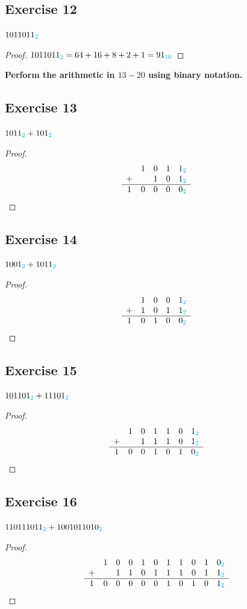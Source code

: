 \documentclass[14pt]{extarticle}
\newcommand{\base}[1]{{\color{cyan}#1}} \newcommand{\da}{\downarrow}
\begin{document}
\subsection{Exercise 12} $1011011_\base{2}$
\begin{proof} $1011011_\base{2} = 64 + 16 + 8 + 2 + 1 = 91_\base{10}$
\end{proof}

{\bf \color{cyan} Perform the arithmetic in $13-20$ using binary notation.}

\subsection{Exercise 13} $1011_\base{2} + 101_\base{2}$
\begin{proof} $$ \begin{array}{ccccc} &1&0&1&1_\base{2}\\ +& &1&0&1_\base{2}\\
\hline 1&0&0&0&0_\base{2}\\ \end{array} $$ \end{proof}

\subsection{Exercise 14} $1001_\base{2} + 1011_\base{2}$
\begin{proof} $$ \begin{array}{ccccc} &1&0&0&1_\base{2}\\ +&1&0&1&1_\base{2}\\
\hline 1&0&1&0&0_\base{2}\\ \end{array} $$ \end{proof}

\subsection{Exercise 15} $101101_\base{2} + 11101_\base{2}$
\begin{proof} $$ \begin{array}{ccccccc} &1&0&1&1&0&1_\base{2}\\ +&
&1&1&1&0&1_\base{2}\\ \hline 1&0&0&1&0&1&0_\base{2}\\ \end{array} $$ \end{proof}

\subsection{Exercise 16} $110111011_\base{2} + 1001011010_\base{2}$
\begin{proof} $$ \begin{array}{ccccccccccc} &1&0&0&1&0&1&1&0&1&0_\base{2}\\ +&
&1&1&0&1&1&1&0&1&1_\base{2}\\ \hline 1&0&0&0&0&0&1&0&1&0&1_\base{2}\\
\end{array} $$ \end{proof}
\end{document}
